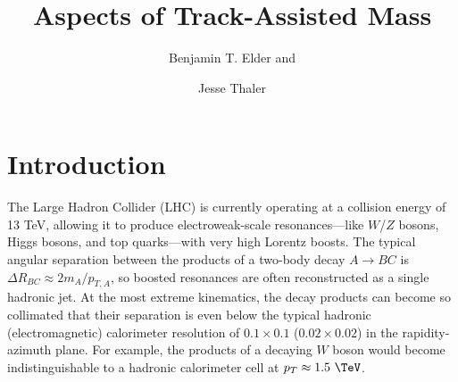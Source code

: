 \documentclass[letterpaper,11pt]{article}
\title{Aspects of Track-Assisted Mass}
\author{Benjamin T. Elder and}
\author{Jesse Thaler}
\affiliation{Center for Theoretical Physics, Massachusetts Institute of Technology, Cambridge, MA 02139, USA}
\begin{document}
 
\maketitle


\section{Introduction}



The Large Hadron Collider (LHC) is currently operating at a collision energy of 13 TeV, allowing it to produce electroweak-scale resonances---like $W$/$Z$ bosons, Higgs bosons, and top quarks---with very high Lorentz boosts. 
%
The typical angular separation between the products of a two-body decay $A \rightarrow BC$ is $\Delta R_{BC} \approx 2m_A/p_{T,A}$, so boosted resonances are often reconstructed as a single hadronic jet.
%
At the most extreme kinematics, the decay products can become so collimated that their separation is even below the typical hadronic (electromagnetic) calorimeter resolution of $0.1\times 0.1$ ($0.02\times 0.02$) in the rapidity-azimuth plane.
%
For example, the products of a decaying $W$ boson would become indistinguishable to a hadronic calorimeter cell at $p_T \approx 1.5~\TeV$.
\end{document}
